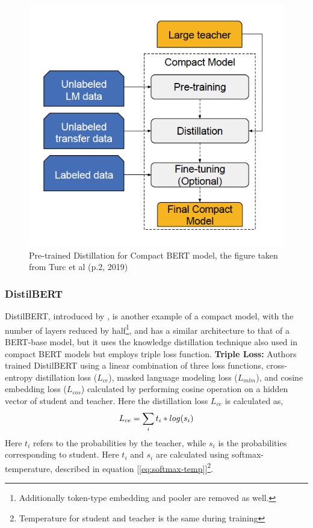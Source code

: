 \documentclass[11pt]{article}
\begin{document}
\begin{figure}
\label{fig:small_BERT}
    \centering
    \includegraphics[scale=0.6]{figures/smallBERT.png}
    \caption{Pre-trained Distillation for Compact BERT model, the figure taken from Turc et al (p.2, 2019)}
    \label{fig:smallBERT_archi}
\end{figure}

\subsubsection{DistilBERT}
DistilBERT, introduced by \cite{distilbert}, is another example of a compact model, with the number of layers reduced by half\footnote{Additionally token-type embedding and pooler are removed as well.}, and has a similar architecture to that of a BERT-base model, but  it uses the knowledge distillation technique also used in compact BERT models but employs triple loss function. 
\textbf{Triple Loss:}
Authors trained DistilBERT using a linear combination of three loss functions, cross-entropy distillation loss ($L_{ce}$), masked language modeling loss ($L_{mlm}$), and cosine embedding loss ($L_{cos}$) calculated by performing cosine operation on a hidden vector of student and teacher. Here the distillation loss $L_{ce}$ is calculated as,
\begin{equation}
 \small L_{ce}=\sum_i t_i * log(s_i)
\end{equation}
Here $t_i$ refers to the probabilities by the teacher, while $s_i$ is the probabilities corresponding to student. Here $t_i$ and $s_i$ are calculated using softmax-temperature, described in equation [\ref{eq:softmax-temp}]\footnote{Temperature for student and teacher is the same during training}.
\end{document}
